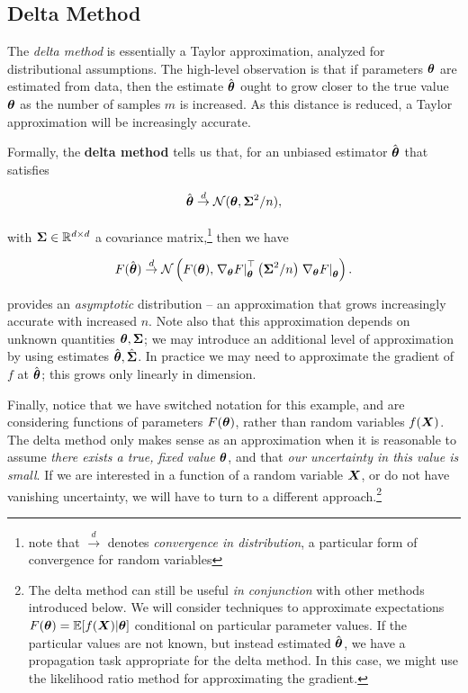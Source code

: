 \documentclass[../primer.tex]{subfiles}
\begin{document}
\subsection{Delta Method}
The \emph{delta method} is essentially a Taylor approximation, analyzed for
distributional assumptions. The high-level observation is that if parameters
$\boldsymbol{\theta}$ are estimated from data, then the estimate $\hat{\boldsymbol{\theta}}$ ought to
grow closer to the true value $\boldsymbol{\theta}$ as the number of samples $m$ is
increased. As this distance is reduced, a Taylor approximation will be
increasingly accurate.

Formally, the \textbf{delta method} tells us that, for an unbiased estimator
$\hat{\boldsymbol{\theta}}$ that satisfies

\begin{equation} \label{eq:ch4-delta-est}
  \hat{\boldsymbol{\theta}} \stackrel{d}{\to} \mathcal{N}(\boldsymbol{\theta}, \boldsymbol{\Sigma}^2/n),
\end{equation}

\noindent with $\boldsymbol{\Sigma}\in\mathbb{R}^{d\times d}$ a covariance matrix,\footnote{note
  that $\stackrel{d}{\to}$ denotes \emph{convergence in distribution}, a
  particular form of convergence for random variables} then we have

\begin{equation} \label{eq:ch4-delta-fcn}
  F(\hat{\v\theta}) \stackrel{d}{\to} %
  \dN\left(F(\v\theta),
    \left.\nabla_{\v\theta}F\right|_{\v\theta}^{\top}\left(\m\Sigma^2/n\right) %
      \left.\nabla_{\v\theta}F\right|_{\v\theta}\right).
\end{equation}

\noindent {} provides an \emph{asymptotic} distribution --
an approximation that grows increasingly accurate with increased $n$. Note also
that this approximation depends on unknown quantities $\boldsymbol{\theta},\boldsymbol{\Sigma}$; we
may introduce an additional level of approximation by using estimates
$\hat{\boldsymbol{\theta}},\hat{\boldsymbol{\Sigma}}$. In practice we may need to approximate the
gradient of $f$ at $\hat{\boldsymbol{\theta}}$; this grows only linearly in dimension.

Finally, notice that we have switched notation for this example, and are
considering functions of parameters $F(\boldsymbol{\theta})$, rather than random variables
$f(\boldsymbol{X})$. The delta method only makes sense as an approximation when it is
reasonable to assume \emph{there exists a true, fixed value} $\boldsymbol{\theta}$, and
that \emph{our uncertainty in this value is small}. If we are interested in a
function of a random variable $\boldsymbol{X}$, or do not have vanishing uncertainty, we
will have to turn to a different approach.\footnote{The delta method can still
  be useful \emph{in conjunction} with other methods introduced below. We will
  consider techniques to approximate expectations $F(\boldsymbol{\theta}) =
  \mathbb{E}[f(\boldsymbol{X})|\boldsymbol{\theta}]$ conditional on particular parameter values. If the
  particular values are not known, but instead estimated $\hat{\boldsymbol{\theta}}$, we
  have a propagation task appropriate for the delta method. In this case, we
  might use the likelihood ratio method for approximating the
  gradient.\cite{l1990unified}}
\end{document}
